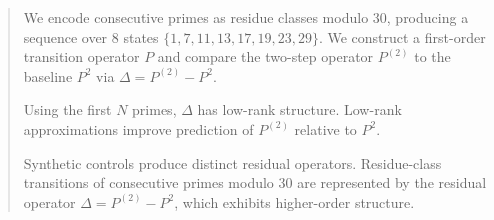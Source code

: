 \begin{abstract}
We encode consecutive primes as residue classes modulo $30$, producing a sequence over 8 states $\{1,7,11,13,17,19,23,29\}$. We construct a first-order transition operator $P$ and compare the two-step operator $P^{(2)}$ to the baseline $P^2$ via $\Delta = P^{(2)} - P^2$.

Using the first $N$ primes, $\Delta$ has low-rank structure. Low-rank approximations improve prediction of $P^{(2)}$ relative to $P^2$.

Synthetic controls produce distinct residual operators. Residue-class transitions of consecutive primes modulo $30$ are represented by the residual operator $\Delta = P^{(2)} - P^2$, which exhibits higher-order structure.
\end{abstract}
